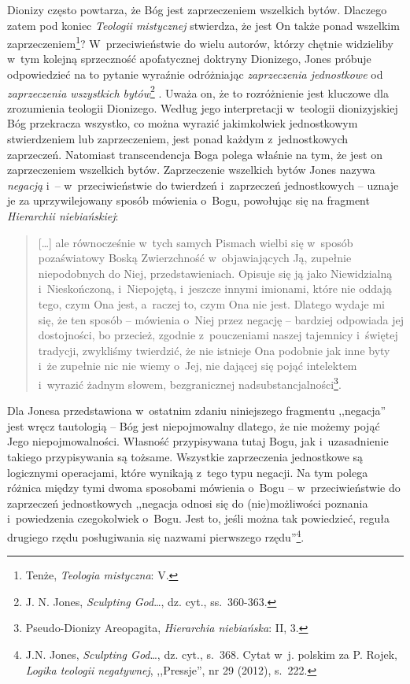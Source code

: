 Dionizy często powtarza, że Bóg jest zaprzeczeniem wszelkich bytów. Dlaczego zatem pod koniec \textit{Teologii mistycznej} stwierdza, że jest On także ponad wszelkim zaprzeczeniem\footnote{Tenże, \textit{Teologia mistyczna}: V.}? W~przeciwieństwie do wielu autorów, którzy chętnie widzieliby w~tym kolejną sprzeczność apofatycznej doktryny Dionizego, Jones próbuje odpowiedzieć na to pytanie wyraźnie odróżniając \textit{zaprzeczenia jednostkowe} od \textit{zaprzeczenia wszystkich bytów}\footnote{J. N. Jones, \textit{Sculpting God}\ldots, dz. cyt., ss.~360-363.}
. Uważa on, że to rozróżnienie jest kluczowe dla zrozumienia teologii Dionizego. Według jego interpretacji w~teologii dionizyjskiej Bóg przekracza wszystko, co można wyrazić jakimkolwiek jednostkowym stwierdzeniem lub zaprzeczeniem, jest ponad każdym z~jednostkowych zaprzeczeń. Natomiast transcendencja Boga polega właśnie na tym, że jest on zaprzeczeniem wszelkich bytów. Zaprzeczenie wszelkich bytów Jones nazywa \textit{negacją} i~-- w~przeciwieństwie do twierdzeń i~zaprzeczeń jednostkowych -- uznaje je za uprzywilejowany sposób mówienia o~Bogu, powołując się na fragment \textit{Hierarchii niebiańskiej}:

\begin{quote}
[\ldots] ale równocześnie w~tych samych Pismach wielbi się w~sposób pozaświatowy Boską Zwierzchność w~objawiających Ją, zupełnie niepodobnych do Niej, przedstawieniach. Opisuje się ją jako Niewidzialną i~Nieskończoną, i~Niepojętą, i~jeszcze innymi imionami, które nie oddają tego, czym Ona jest, a~raczej to, czym Ona nie jest. Dlatego wydaje mi się, że ten sposób -- mówienia o~Niej przez negację -- bardziej odpowiada jej dostojności, bo przecież, zgodnie z~pouczeniami naszej tajemnicy i~świętej tradycji, zwykliśmy twierdzić, że nie istnieje Ona podobnie jak inne byty i~że zupełnie nic nie wiemy o~Jej, nie dającej się pojąć intelektem i~wyrazić żadnym słowem, bezgranicznej nadsubstancjalności\footnote{Pseudo-Dionizy Areopagita, \textit{Hierarchia niebiańska}: II, 3.}.
\end{quote}

Dla Jonesa przedstawiona w~ostatnim zdaniu niniejszego fragmentu ,,negacja'' jest wręcz tautologią -- Bóg jest niepojmowalny dlatego, że nie możemy pojąć Jego niepojmowalności. Własność przypisywana tutaj Bogu, jak i~uzasadnienie takiego przypisywania są tożsame. Wszystkie zaprzeczenia jednostkowe są logicznymi operacjami, które wynikają z~tego typu negacji. Na tym polega różnica między tymi dwoma sposobami mówienia o~Bogu -- w~przeciwieństwie do zaprzeczeń jednostkowych ,,negacja odnosi się do (nie)możliwości poznania i~powiedzenia czegokolwiek o~Bogu. Jest to, jeśli można tak powiedzieć, reguła drugiego rzędu posługiwania się nazwami pierwszego rzędu''\footnote{J.N. Jones, \textit{Sculpting God}\ldots, dz. cyt., s.~368. Cytat w~j. polskim za P. Rojek, \textit{Logika teologii negatywnej}, ,,Pressje'', nr 29 (2012), s.~222.}.


